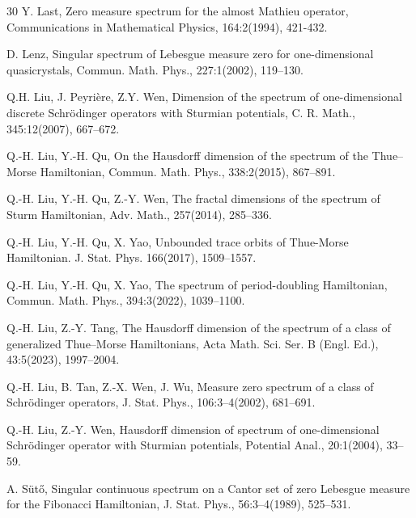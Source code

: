 \documentclass{amsart}
\theoremstyle{definition}
\begin{document}
\begin{thebibliography}{30}
 Y. Last,
Zero measure spectrum for the almost Mathieu operator,
Communications in Mathematical Physics, 164:2(1994), 421-432.

D. Lenz,
Singular spectrum of Lebesgue measure zero for one-dimensional
quasicrystals,
Commun. Math. Phys., 227:1(2002), 119--130.

Q.H. Liu, J. Peyri\`ere, Z.Y. Wen, Dimension of the spectrum of one-dimensional discrete Schr\"odinger
operators with Sturmian potentials, C. R. Math., 345:12(2007), 667–672.

Q.-H. Liu, Y.-H. Qu,
On the Hausdorff dimension of the spectrum of the Thue--Morse
Hamiltonian,
Commun. Math. Phys., 338:2(2015), 867--891.

Q.-H. Liu, Y.-H. Qu, Z.-Y. Wen,
The fractal dimensions of the spectrum of Sturm Hamiltonian,
Adv. Math., 257(2014), 285--336.

Q.-H. Liu, Y.-H. Qu, X. Yao, 
Unbounded trace orbits of Thue-Morse Hamiltonian. J. Stat. Phys. 166(2017),
1509--1557. 

Q.-H. Liu, Y.-H. Qu, X. Yao,
The spectrum of period-doubling Hamiltonian,
Commun. Math. Phys., 394:3(2022), 1039--1100.

Q.-H. Liu, Z.-Y. Tang,
The Hausdorff dimension of the spectrum of a class of generalized
Thue--Morse Hamiltonians,
Acta Math. Sci. Ser. B (Engl. Ed.), 43:5(2023), 1997--2004.

Q.-H. Liu, B. Tan, Z.-X. Wen, J. Wu,
Measure zero spectrum of a class of Schr\"odinger operators,
J. Stat. Phys., 106:3--4(2002), 681--691.

Q.-H. Liu, Z.-Y. Wen,
Hausdorff dimension of spectrum of one-dimensional Schr\"odinger
operator with Sturmian potentials,
Potential Anal., 20:1(2004), 33--59.

A. S\"ut\H{o},
Singular continuous spectrum on a Cantor set of zero Lebesgue measure
for the Fibonacci Hamiltonian,
J. Stat. Phys., 56:3--4(1989), 525--531.




\end{thebibliography}
\end{document}
